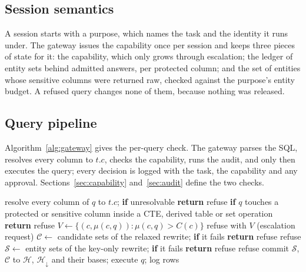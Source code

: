 \documentclass[10pt,journal,compsoc]{IEEEtran}
\begin{document}
\subsection{Session semantics}
A session starts with a purpose, which names the task and the identity it runs under. The gateway issues the capability once per session and keeps three pieces of state for it: the capability, which only grows through escalation; the ledger of entity sets behind admitted answers, per protected column; and the set of entities whose sensitive columns were returned raw, checked against the purpose's entity budget. A refused query changes none of them, because nothing was released.

\subsection{Query pipeline}
Algorithm~\ref{alg:gateway} gives the per-query check. The gateway parses the SQL, resolves every column to $t.c$, checks the capability, runs the audit, and only then executes the query; every decision is logged with the task, the capability and any approval. Sections~\ref{sec:capability} and~\ref{sec:audit} define the two checks.

\begin{algorithm}[!t]
\caption{Gateway check for query $q$ under capability $C$}\label{alg:gateway}
\begin{algorithmic}[1]
\State resolve every column of $q$ to $t.c$; \textbf{if} unresolvable \textbf{return} refuse
\State \textbf{if} $q$ touches a protected or sensitive column inside a CTE, derived table or set operation \textbf{return} refuse
\State $V\gets\{(c,\mu(c,q)):\mu(c,q)>C(c)\}$ 
 \Return refuse with $V$ (escalation request) \EndIf
{}
  \State $\mathcal{C}\gets$ candidate sets of the relaxed rewrite; \textbf{if} it fails \textbf{return} refuse
   \Return refuse  \EndIf
\EndFor
{}
  \State $\mathcal{S}\gets$ entity sets of the key-only rewrite; \textbf{if} it fails \textbf{return} refuse
   \Return refuse  \EndIf
\EndFor
\State commit $\mathcal{S}$, $\mathcal{C}$ to $\mathcal{H}$, $\mathcal{H}_{\downarrow}$ and their bases; execute $q$; log
\State \Return rows
\end{algorithmic}
\end{algorithm}
\end{document}
